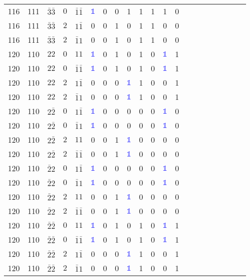 \begin{longtable*}{c| cccccccccccccccccccc }
116& 111& $\bar{3}\bar{3}$& $0$& $\bar{1}\bar{1}$& \textcolor{blue}{$\mathds{1}$}& 0& 0& 1& 1& 1& 1& 0\\
116& 111& $\bar{3}\bar{3}$& $2$& $1\bar{1}$& 0& 0& 1& 0& 1& 1& 0& 0\\
116& 111& $\bar{3}\bar{3}$& $2$& $\bar{1}1$& 0& 0& 1& 0& 1& 1& 0& 0\\
120& 110& $22$& $0$& $11$& \textcolor{blue}{$\mathds{1}$}& 0& 1& 0& 1& 0& \textcolor{blue}{$\mathds{1}$}& 1\\
120& 110& $22$& $0$& $\bar{1}\bar{1}$& \textcolor{blue}{$\mathds{1}$}& 0& 1& 0& 1& 0& \textcolor{blue}{$\mathds{1}$}& 1\\
120& 110& $22$& $2$& $1\bar{1}$& 0& 0& 0& \textcolor{blue}{$\mathds{1}$}& 1& 0& 0& 1\\
120& 110& $22$& $2$& $\bar{1}1$& 0& 0& 0& \textcolor{blue}{$\mathds{1}$}& 1& 0& 0& 1\\
120& 110& $2\bar{2}$& $0$& $1\bar{1}$& \textcolor{blue}{$\mathds{1}$}& 0& 0& 0& 0& 0& \textcolor{blue}{$\mathds{1}$}& 0\\
120& 110& $2\bar{2}$& $0$& $\bar{1}1$& \textcolor{blue}{$\mathds{1}$}& 0& 0& 0& 0& 0& \textcolor{blue}{$\mathds{1}$}& 0\\
120& 110& $2\bar{2}$& $2$& $11$& 0& 0& 1& \textcolor{blue}{$\mathds{1}$}& 0& 0& 0& 0\\
120& 110& $2\bar{2}$& $2$& $\bar{1}\bar{1}$& 0& 0& 1& \textcolor{blue}{$\mathds{1}$}& 0& 0& 0& 0\\
120& 110& $\bar{2}2$& $0$& $1\bar{1}$& \textcolor{blue}{$\mathds{1}$}& 0& 0& 0& 0& 0& \textcolor{blue}{$\mathds{1}$}& 0\\
120& 110& $\bar{2}2$& $0$& $\bar{1}1$& \textcolor{blue}{$\mathds{1}$}& 0& 0& 0& 0& 0& \textcolor{blue}{$\mathds{1}$}& 0\\
120& 110& $\bar{2}2$& $2$& $11$& 0& 0& 1& \textcolor{blue}{$\mathds{1}$}& 0& 0& 0& 0\\
120& 110& $\bar{2}2$& $2$& $\bar{1}\bar{1}$& 0& 0& 1& \textcolor{blue}{$\mathds{1}$}& 0& 0& 0& 0\\
120& 110& $\bar{2}\bar{2}$& $0$& $11$& \textcolor{blue}{$\mathds{1}$}& 0& 1& 0& 1& 0& \textcolor{blue}{$\mathds{1}$}& 1\\
120& 110& $\bar{2}\bar{2}$& $0$& $\bar{1}\bar{1}$& \textcolor{blue}{$\mathds{1}$}& 0& 1& 0& 1& 0& \textcolor{blue}{$\mathds{1}$}& 1\\
120& 110& $\bar{2}\bar{2}$& $2$& $1\bar{1}$& 0& 0& 0& \textcolor{blue}{$\mathds{1}$}& 1& 0& 0& 1\\
120& 110& $\bar{2}\bar{2}$& $2$& $\bar{1}1$& 0& 0& 0& \textcolor{blue}{$\mathds{1}$}& 1& 0& 0& 1\\

\end{longtable*}
